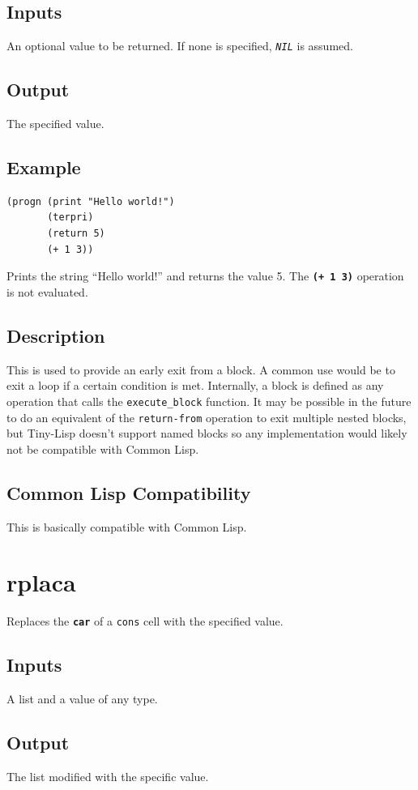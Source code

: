\documentclass[10pt, openany]{book}
\newcommand{\operation}[1]{\textbf{\texttt{#1}}}
\newcommand{\function}[1]{\texttt{#1}}
\newcommand{\constant}[1]{\emph{\texttt{#1}}}
\newcommand{\keyword}[1]{\texttt{#1}}
\newcommand{\datatype}[1]{\texttt{#1}}
\newcommand{\tl}{Tiny-Lisp}
\newcommand{\cl}{Common Lisp}
\begin{document}
\subsection{Inputs}
An optional value to be returned.  If none is specified, \constant{NIL} is assumed.
\subsection{Output}
The specified value.
\subsection{Example}
\begin{lstlisting}
(progn (print "Hello world!")
       (terpri)
       (return 5)
       (+ 1 3))
\end{lstlisting}
Prints the string ``Hello world!'' and returns the value 5.  The \operation{(+ 1 3)} operation is not evaluated.
\subsection{Description}
This is used to provide an early exit from a block.  A common use would be to exit a loop if a certain condition is met.  Internally, a block is defined as any operation that calls the \function{execute\_block} function.  It may be possible in the future to do an equivalent of the \keyword{return-from} operation to exit multiple nested blocks, but \tl{} doesn't support named blocks so any implementation would likely not be compatible with \cl.
\subsection{Common Lisp Compatibility}
This is basically compatible with \cl.

\section{rplaca}
Replaces the \operation{car} of a \datatype{cons} cell with the specified value.
\subsection{Inputs}
A list and a value of any type.
\subsection{Output}
The list modified with the specific value.
\end{document}
